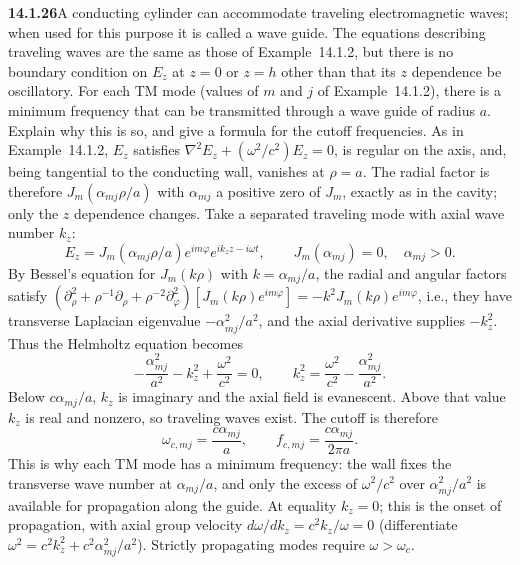 \par\bigskip
\noindent\textbf{14.1.26}\quad A conducting cylinder can accommodate
traveling electromagnetic waves; when used for this purpose it is called
a wave guide. The equations describing traveling waves are the same as
those of Example~14.1.2, but there is no boundary condition on $E_{z}$
at $z=0$ or $z=h$ other than that its $z$ dependence be oscillatory.
For each TM mode (values of $m$ and $j$ of Example~14.1.2), there is a
minimum frequency that can be transmitted through a wave guide of
radius $a$. Explain why this is so, and give a formula for the cutoff
frequencies.
\solution
As in Example~14.1.2, $E_z$ satisfies
$\nabla^2E_z+(\omega^2/c^2)E_z=0$, is regular on the axis, and, being
tangential to the conducting wall, vanishes at $\rho=a$. The radial
factor is therefore $J_m(\alpha_{mj}\rho/a)$ with $\alpha_{mj}$ a
positive zero of $J_m$, exactly as in the cavity; only the $z$
dependence changes. Take a separated traveling mode with axial wave
number $k_z$:
\[
E_z=J_m(\alpha_{mj}\rho/a)e^{im\varphi}
 e^{ik_z z-i\omega t},
\qquad J_m(\alpha_{mj})=0,\quad\alpha_{mj}>0.
\]
By Bessel's equation for $J_m(k\rho)$ with $k=\alpha_{mj}/a$, the
radial and angular factors satisfy
$(\partial_\rho^2+\rho^{-1}\partial_\rho+\rho^{-2}\partial_\varphi^2)
[J_m(k\rho)e^{im\varphi}]=-k^2J_m(k\rho)e^{im\varphi}$, i.e., they
have transverse Laplacian eigenvalue $-\alpha_{mj}^2/a^2$, and the
axial derivative supplies $-k_z^2$. Thus the Helmholtz equation
becomes
\[
-\frac{\alpha_{mj}^2}{a^2}-k_z^2+\frac{\omega^2}{c^2}=0,
\qquad k_z^2=\frac{\omega^2}{c^2}-\frac{\alpha_{mj}^2}{a^2}.
\]
Below $c\alpha_{mj}/a$, $k_z$ is imaginary and the axial field is
evanescent. Above that value $k_z$ is real and nonzero, so traveling
waves exist. The cutoff is therefore
\[
\boxed{\omega_{c,mj}=\frac{c\alpha_{mj}}a,
\qquad f_{c,mj}=\frac{c\alpha_{mj}}{2\pi a}}.
\]
This is why each TM mode has a minimum frequency: the wall fixes the
transverse wave number at $\alpha_{mj}/a$, and only the excess of
$\omega^2/c^2$ over $\alpha_{mj}^2/a^2$ is available for propagation
along the guide.
At equality $k_z=0$; this is the onset of propagation, with axial
group velocity $d\omega/dk_z=c^2k_z/\omega=0$ (differentiate
$\omega^2=c^2k_z^2+c^2\alpha_{mj}^2/a^2$). Strictly propagating
modes require $\omega>\omega_c$.

